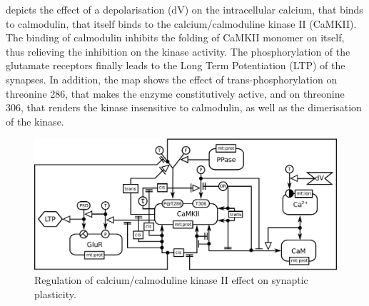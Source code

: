  depicts the effect of a depolarisation (dV) on the intracellular calcium, that binds to calmodulin, that itself binds to the calcium/calmoduline kinase II (CaMKII). The binding of calmodulin inhibits the folding of CaMKII monomer on itself, thus relieving the inhibition on the kinase activity. The phosphorylation of the glutamate receptors finally leads to the Long Term Potentiation (LTP) of the synapses. In addition, the map shows the effect of trans-phosphorylation on threonine 286, that makes the enzyme constitutively active, and on threonine 306, that renders the kinase insensitive to calmodulin, as well as the dimerisation of the kinase.

\begin{figure}[H]
  \centering
  \vspace*{-0.75em}
  \includegraphics[scale=0.45]{examples/CaMKII-intro}
   \caption{Regulation of calcium/calmoduline kinase II effect on synaptic plasticity.}
  \label{fig:CaMKII}
\end{figure}

